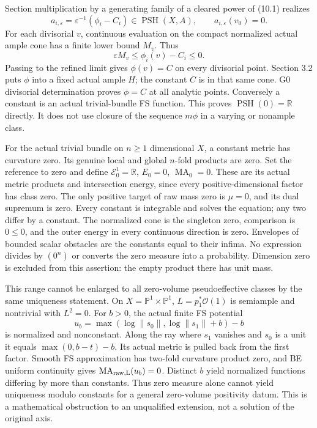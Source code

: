 \documentclass[
  10pt,
]{article}
\begin{document}
Section multiplication by a generating family of a cleared power of
(10.1) realizes \[a_{i,\varepsilon}=\varepsilon^{-1}(\phi_i-C_i)
\in\operatorname{PSH}(X,A),\qquad a_{i,\varepsilon}(v_0)=0.\tag{10.2}\]
For each divisorial \(v\), continuous evaluation on the compact
normalized actual ample cone has a finite lower bound \(M_v\). Thus
\[\varepsilon M_v\leq\phi_i(v)-C_i\leq0.\tag{10.3}\] Passing to the
refined limit gives \(\phi(v)=C\) on every divisorial point. Section 3.2
puts \(\phi\) into a fixed actual ample \(H\); the constant \(C\) is in
that same cone. G0 divisorial determination proves \(\phi=C\) at all
analytic points. Conversely a constant is an actual trivial-bundle FS
function. This proves \(\operatorname{PSH}(0)=\mathbb R\) directly. It
does not use closure of the sequence \(m\phi\) in a varying or nonample
class.

For the actual trivial bundle on \(n\geq1\) dimensional \(X\), a
constant metric has curvature zero. Its genuine local and global
\(n\)-fold products are zero. Set the reference to zero and define
\(\mathcal E^1_0=\mathbb R\), \(E_0=0\), \(\operatorname{MA}_0=0\).
These are its actual metric products and intersection energy, since
every positive-dimensional factor has class zero. The only positive
target of raw mass zero is \(\mu=0\), and its dual supremum is zero.
Every constant is integrable and solves the equation; any two differ by
a constant. The normalized cone is the singleton zero, comparison is
\(0\leq0\), and the outer energy in every continuous direction is zero.
Envelopes of bounded scalar obstacles are the constants equal to their
infima. No expression divides by \((0^n)\) or converts the zero measure
into a probability. Dimension zero is excluded from this assertion: the
empty product there has unit mass.

This range cannot be enlarged to all zero-volume pseudoeffective classes
by the same uniqueness statement. On \(X=\mathbb P^1\times\mathbb P^1\),
\(L=p_1^*\mathcal O(1)\) is semiample and nontrivial with \(L^2=0\). For
\(b>0\), the actual finite FS potential
\[u_b=\max(\log\|s_0\|,\log\|s_1\|+b)-b\] is normalized and nonconstant.
Along the ray where \(s_1\) vanishes and \(s_0\) is a unit it equals
\(\max(0,b-t)-b\). Its actual metric is pulled back from the first
factor. Smooth FS approximation has two-fold curvature product zero, and
BE uniform continuity gives \(\operatorname{MA}_{\rm raw,L}(u_b)=0\).
Distinct \(b\) yield normalized functions differing by more than
constants. Thus zero measure alone cannot yield uniqueness modulo
constants for a general zero-volume positivity datum. This is a
mathematical obstruction to an unqualified extension, not a solution of
the original axis.
\end{document}
